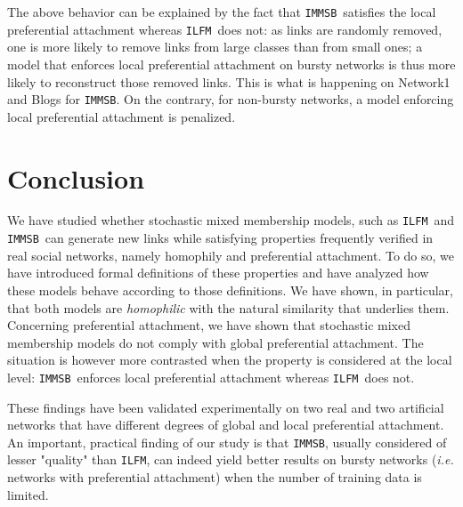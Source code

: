 \documentclass[journal]{IEEEtran}
\newcommand{\ifm}{\texttt{ILFM}}
\newcommand{\imb}{\texttt{IMMSB}}
\begin{document}
The above behavior can be explained by the fact that \imb\ satisfies the local preferential attachment whereas \ifm\ does not: as links are randomly removed, one is more likely to remove links from large classes than from small ones; a model that enforces local preferential attachment on bursty networks is thus more likely to reconstruct those removed links. This is what is happening on Network1 and Blogs for \imb. On the contrary, for non-bursty networks, a model enforcing local preferential attachment is penalized.

\section{Conclusion}
\label{sec:concl}

We have studied whether stochastic mixed membership models, such as \ifm\ and \imb\, can generate new links while satisfying properties frequently verified in real  social networks, namely homophily and preferential attachment. To do so, we have introduced formal definitions of these properties and have analyzed how these models behave according to those definitions. We have shown, in particular, that both models are \textit{homophilic} with the natural similarity that underlies them. Concerning preferential attachment, we have shown that stochastic mixed membership models do not comply with global preferential attachment. The situation is however more contrasted when the property is considered at the local level: \imb\ enforces local preferential attachment whereas \ifm\ does not.

These findings have been validated experimentally on two real and two artificial networks that have different degrees of global and local preferential attachment. An important, practical finding of our study is that \imb, usually considered of lesser "quality" than \ifm, can indeed yield better results on bursty networks (\textit{i.e.} networks with preferential attachment) when the number of training data is limited.



\end{document}
